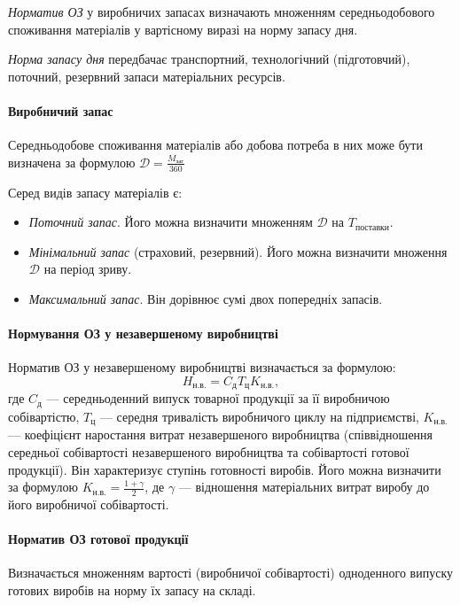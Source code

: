 \documentclass[a5paper,10pt,notitlepage,pdftex,headsepline]{scrartcl}
\begin{document}
      \emph{Норматив ОЗ} у виробничих запасах визначають множенням
      середньодобового споживання матеріалів у вартісному виразі на норму
      запасу дня.

      \emph{Норма запасу дня} передбачає транспортний, технологічний
      (підготовчий), поточний, резервний запаси матеріальних ресурсів.

      \paragraph{Виробничий запас}
        Середньодобове споживання матеріалів або добова потреба в них може
        бути визначена за формулою $\displaystyle \mathcal{D} =
        \frac{M_\text{заг}}{360}$

        Серед видів запасу матеріалів є:
        \begin{itemize}
          \item \emph{Поточний запас}.
            Його можна визначити множенням $\mathcal{D}$ на $T_\text{поставки}$.
          \item \emph{Мінімальний запас} (страховий, резервний).
            Його можна визначити множення $\mathcal{D}$ на період зриву.
          \item \emph{Максимальний запас}.
            Він дорівнює сумі двох попередніх запасів.
        \end{itemize}

      \paragraph{Нормування ОЗ у незавершеному виробництві}
        Норматив ОЗ у незавершеному виробництві визначається за формулою:
          \[
            H_\text{н.в.} = C_\text{д} T_\text{ц} K_\text{н.в.},
          \]
        где $C_\text{д}$ --- середньоденний випуск товарної продукції за її
        виробничою собівартістю, $T_\text{ц}$ --- середня тривалість
        виробничого циклу на підприємстві, $K_\text{н.в.}$ --- коефіцієнт
        наростання витрат незавершеного виробництва (співвідношення середньої
        собівартості незавершеного виробництва та собівартості готової
        продукції).
        Він характеризує ступінь готовності виробів.
        Його можна визначити за формулою $\displaystyle K_\text{н.в.} =
        \frac{1 + \gamma}{2}$, де $\gamma$ --- відношення матеріальних витрат
        виробу до його виробничої собівартості.
      \paragraph{Норматив ОЗ готової продукції}
        Визначається множенням вартості (виробничої собівартості) одноденного
        випуску готових виробів на норму їх запасу на складі.
\end{document}
